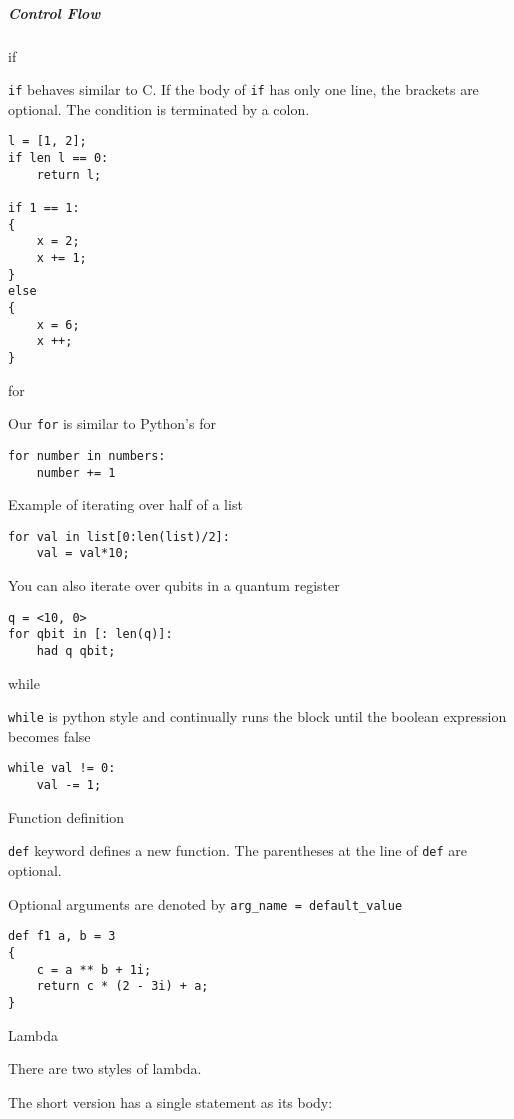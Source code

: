 \documentclass[]{article}
\begin{document}
\subparagraph{Control Flow}\label{control-flow}

if

\texttt{if} behaves similar to C. If the body of \texttt{if} has only
one line, the brackets are optional. The condition is terminated by a
colon.

\begin{verbatim}
l = [1, 2];
if len l == 0:
    return l;

if 1 == 1:
{
    x = 2;
    x += 1;
}
else
{
    x = 6;
    x ++;
}
\end{verbatim}

for

Our \texttt{for} is similar to Python's for

\begin{verbatim}
for number in numbers:
    number += 1
\end{verbatim}

Example of iterating over half of a list

\begin{verbatim}
for val in list[0:len(list)/2]:
    val = val*10;
\end{verbatim}

You can also iterate over qubits in a quantum register

\begin{verbatim}
q = <10, 0>
for qbit in [: len(q)]:
    had q qbit;
\end{verbatim}

while

\texttt{while} is python style and continually runs the block until the
boolean expression becomes false

\begin{verbatim}
while val != 0:
    val -= 1;
\end{verbatim}

Function definition

\texttt{def} keyword defines a new function. The parentheses at the line
of \texttt{def} are optional.

Optional arguments are denoted by \texttt{arg\_name = default\_value}

\begin{verbatim}
def f1 a, b = 3
{
    c = a ** b + 1i;
    return c * (2 - 3i) + a;
}
\end{verbatim}

Lambda

There are two styles of lambda.

The short version has a single statement as its body:
\end{document}
